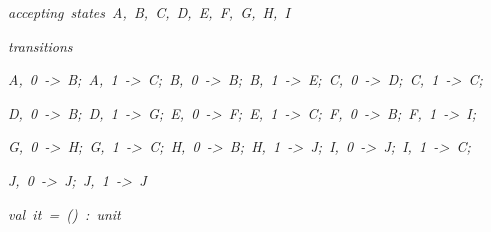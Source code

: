 \begin{list}{}
\item[]\textsl{accepting\ states\ A,\ B,\ C,\ D,\ E,\ F,\ G,\ H,\ I}
\item[]\textsl{transitions}
\item[]\textsl{A,\ 0\ ->\ B;\ A,\ 1\ ->\ C;\ B,\ 0\ ->\ B;\ B,\ 1\ ->\ E;\ C,\ 0\ ->\ D;\ C,\ 1\ ->\ C;}
\item[]\textsl{D,\ 0\ ->\ B;\ D,\ 1\ ->\ G;\ E,\ 0\ ->\ F;\ E,\ 1\ ->\ C;\ F,\ 0\ ->\ B;\ F,\ 1\ ->\ I;}
\item[]\textsl{G,\ 0\ ->\ H;\ G,\ 1\ ->\ C;\ H,\ 0\ ->\ B;\ H,\ 1\ ->\ J;\ I,\ 0\ ->\ J;\ I,\ 1\ ->\ C;}
\item[]\textsl{J,\ 0\ ->\ J;\ J,\ 1\ ->\ J}
\item[]\textsl{val\ it\ =\ ()\ :\ unit}
\end{list}
